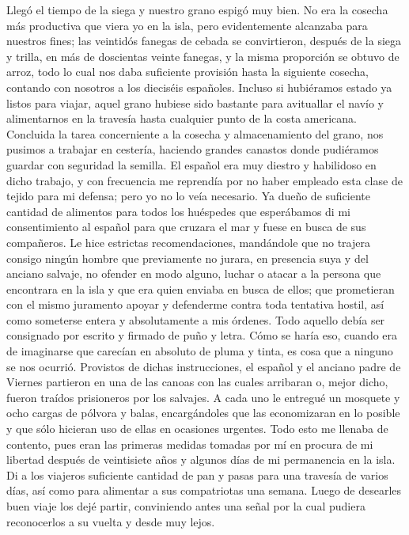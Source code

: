\documentclass{novela}
\begin{document}
    Llegó el tiempo de la siega y nuestro grano espigó muy bien. No era la cosecha más productiva que viera yo en la isla, pero evidentemente alcanzaba para nuestros fines; las veintidós fanegas de cebada se convirtieron, después de la siega y trilla, en más de doscientas veinte fanegas, y la misma proporción se obtuvo de arroz, todo lo cual nos daba suficiente provisión hasta la siguiente cosecha, contando con nosotros a los dieciséis españoles. Incluso si hubiéramos estado ya listos para viajar, aquel grano hubiese sido bastante para avituallar el navío y alimentarnos en la travesía hasta cualquier punto de la costa americana.
    Concluida la tarea concerniente a la cosecha y almacenamiento del grano, nos pusimos a trabajar en cestería, haciendo grandes canastos donde pudiéramos guardar con seguridad la semilla. El español era muy diestro y habilidoso en dicho trabajo, y con frecuencia me reprendía por no haber empleado esta clase de tejido para mi defensa; pero yo no lo veía necesario.
    Ya dueño de suficiente cantidad de alimentos para todos los huéspedes que esperábamos di mi consentimiento al español para que cruzara el mar y fuese en busca de sus compañeros. Le hice estrictas recomendaciones, mandándole que no trajera consigo ningún hombre que previamente no jurara, en presencia suya y del anciano salvaje, no ofender en modo alguno, luchar o atacar a la persona que encontrara en la isla y que era quien enviaba en busca de ellos; que prometieran con el mismo juramento apoyar y defenderme contra toda tentativa hostil, así como someterse entera y absolutamente a mis órdenes. Todo aquello debía ser consignado por escrito y firmado de puño y letra. Cómo se haría eso, cuando era de imaginarse que carecían en absoluto de pluma y tinta, es cosa que a ninguno se nos ocurrió.
    Provistos de dichas instrucciones, el español y el anciano padre de Viernes partieron en una de las canoas con las cuales arribaran o, mejor dicho, fueron traídos prisioneros por los salvajes.
    A cada uno le entregué un mosquete y ocho cargas de pólvora y balas, encargándoles que las economizaran en lo posible y que sólo hicieran uso de ellas en ocasiones urgentes.
    Todo esto me llenaba de contento, pues eran las primeras medidas tomadas por mí en procura de mi libertad después de veintisiete años y algunos días de mi permanencia en la isla. Di a los viajeros suficiente cantidad de pan y pasas para una travesía de varios días, así como para alimentar a sus compatriotas una semana. Luego de desearles buen viaje los dejé partir, conviniendo antes una señal por la cual pudiera reconocerlos a su vuelta y desde muy lejos.
\end{document}
